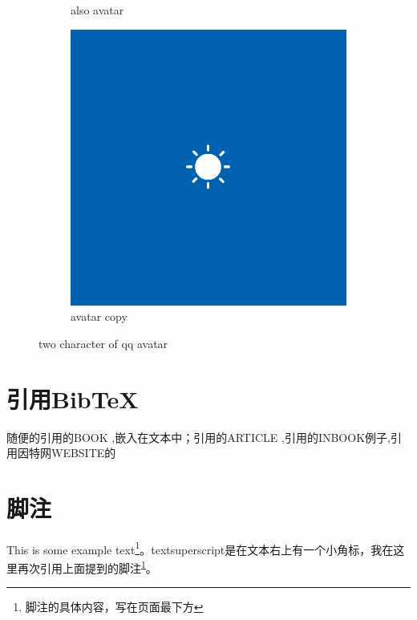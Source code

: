 \begin{figure}[h!]
\begin{subfigure}{0.4\linewidth}
		\caption{also avatar}
	\end{subfigure}
	\begin{subfigure}{0.6\linewidth}
		\includegraphics[width=\linewidth]{avatar.png}
		\caption{avatar copy}
	\end{subfigure}
	\caption{two character of qq avatar}
	\label{fig:avatar}
\end{figure}


\section{引用BibTeX}
随便的引用的BOOK \cite{DUMMY:1} ,嵌入在文本中；引用的ARTICLE \cite{ARTICLE:1},引用的INBOOK例子\cite{BOOK:2},引用因特网WEBSITE\cite{WEBSITE:2}的\cite{WEBSITE:1}
\section{脚注}
This is some example text\footnote{\label{myfootnote}脚注的具体内容，写在页面最下方}。textsuperscript是在文本右上有一个小角标，我在这里再次引用上面提到的脚注\textsuperscript{\ref{myfootnote}}。
